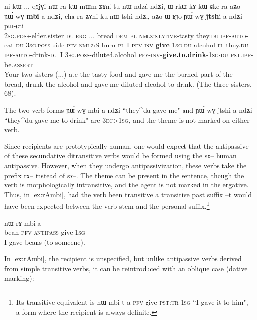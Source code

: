 \documentclass[oldfontcommands,oneside,a4paper,11pt]{article}
\newcommand{\ipa}[1]{{\phon \mbox{#1}}} %
\begin{document}
   \begin{exe}
\ex \label{ex:secundative}
\gll  \ipa{nɤ-pi}   	\ipa{ni}   	\ipa{kɯ}   	...   	\ipa{qɤjɣi}   	\ipa{nɯ}   	\ipa{ra}   	\ipa{kɯ-mɯm}   	\ipa{ʑɤni}   	\ipa{tu-nɯ-ndzá-ndʑi,}   	\ipa{ɯ-rkɯ}   	\ipa{kɤ-kɯ-ɕke}   	\ipa{ra}   	\ipa{aʑo}   	\ipa{ɲɯ́-wɣ-\textbf{mbi}-a-ndʑi,}   	\ipa{cha}   	\ipa{ra}   	\ipa{ʑɤni}   	\ipa{ku-nɯ-tshi-ndʑi,}   	\ipa{aʑo}   	\ipa{ɯ-ʁɟo}   	\ipa{ɲɯ́-wɣ-\textbf{jtshi}-a-ndʑi}   	\ipa{pɯ-ɕti}        \\
\textsc{2sg.poss}-elder.sister \textsc{du} \textsc{erg} ... bread \textsc{dem} \textsc{pl} \textsc{nmlz:stative}-tasty they.\textsc{du} \textsc{ipf}-\textsc{auto}-eat-\textsc{du} \textsc{3sg.poss}-side \textsc{pfv}-\textsc{nmlz:S}-burn \textsc{pl}  I \textsc{pfv}-\textsc{inv}-\textbf{give}-\textsc{1sg}-\textsc{du} alcohol \textsc{pl} they.\textsc{du} \textsc{ipf}-\textsc{auto}-drink-\textsc{du} I \textsc{3sg.poss}-diluted.alcohol \textsc{pfv}-\textsc{inv}-\textbf{give.to.drink}-\textsc{1sg}-\textsc{du} \textsc{pst.ipf}-be.\textsc{assert}  \\
 \glt    Your two sisters (...) ate the tasty food and gave me the burned part of the bread, drunk the alcohol and gave me diluted alcohol to drink.  (The three sisters, 68).
\end{exe} 

The two verb forms \ipa{ɲɯ́-wɣ-mbi-a-ndʑi} ``they^{du} gave me" and 	\ipa{ɲɯ́-wɣ-jtshi-a-ndʑi}  ``they^{du} gave me to drink" are \textsc{3du}>\textsc{1sg}, and the theme is not marked on either verb. 
 
 Since recipients are prototypically human, one would expect that the antipassive of  these   secundative ditransitive verbs would be formed using the \ipa{sɤ}-- human antipassive. However, when they undergo antipassivization, these verbs take the prefix \ipa{rɤ}-- instead of \ipa{sɤ}--. The theme can be present in the sentence, though the verb is morphologically intransitive, and the agent is not marked in the ergative. Thus, in   \ref{ex:rAmbi}, had the verb been transitive a transitive past suffix --\ipa{t} would have been expected between the verb stem and the personal suffix.\footnote{Its transitive equivalent is \ipa{nɯ-mbi-t-a} \textsc{pfv}-give-\textsc{pst:tr}-\textsc{1sg} ``I gave it to him", a form where the recipient is always definite.}

  \begin{exe} 
\ex \label{ex:rAmbi}
\gll \ipa{stoʁ} 	  	\ipa{nɯ-rɤ-mbi-a}   \\
     bean \textsc{pfv}-\textsc{antipass}-give-\textsc{1sg} \\
 \glt     I gave beans (to someone).
\end{exe} 
In \ref{ex:rAmbi}, the recipient is unspecified, but unlike antipassive verbs derived from simple transitive verbs, it can be reintroduced with an oblique case (dative marking):
 
\end{document}
